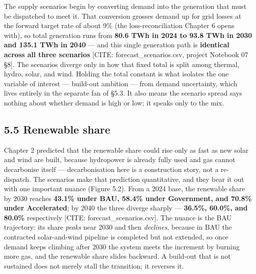 \documentclass[10pt,twocolumn]{article}
\newcommand{\mk}[1]{{\color{amber}\small #1}}
\begin{document}
The supply scenarios begin by converting demand into the generation that must be dispatched to meet it. That conversion grosses demand up for grid losses at the forward target rate of about 9\% (the loss-reconciliation Chapter 6 opens with), so total generation runs from \textbf{80.6 TWh in 2024 to 93.8 TWh in 2030 and 135.1 TWh in 2040} --- and this single generation path is \textbf{identical across all three scenarios} \mk{[CITE: forecast\_scenarios.csv, project Notebook 07 \S{}8]}. The scenarios diverge only in how that fixed total is split among thermal, hydro, solar, and wind. Holding the total constant is what isolates the one variable of interest --- build-out ambition --- from demand uncertainty, which lives entirely in the separate fan of \S{}5.3. It also means the scenario spread says nothing about whether demand is high or low; it speaks only to the mix.

\subsection*{5.5 Renewable share}

Chapter 2 predicted that the renewable share could rise only as fast as new solar and wind are built, because hydropower is already fully used and gas cannot decarbonise itself --- decarbonisation here is a construction story, not a re-dispatch. The scenarios make that prediction quantitative, and they bear it out with one important nuance (Figure 5.2). From a 2024 base, the renewable share by 2030 reaches \textbf{43.1\% under BAU, 58.4\% under Government, and 70.8\% under Accelerated}; by 2040 the three diverge sharply --- \textbf{36.5\%, 60.0\%, and 80.0\%} respectively \mk{[CITE: forecast\_scenarios.csv]}. The nuance is the BAU trajectory: its share \textit{peaks} near 2030 and then \textit{declines}, because in BAU the contracted solar-and-wind pipeline is completed but not extended, so once demand keeps climbing after 2030 the system meets the increment by burning more gas, and the renewable share slides backward. A build-out that is not sustained does not merely stall the transition; it reverses it.
\end{document}
